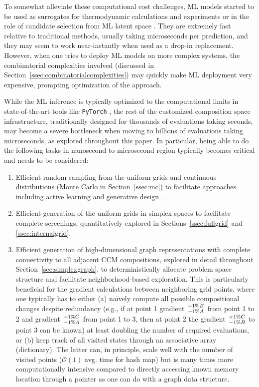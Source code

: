 To somewhat alleviate these computational cost challenges, ML models started to be used as surrogates for thermodynamic calculations and experiments \cite{Debnath2023ComparingAlloys, Tandoc2023MiningAlloys} or in the role of candidate selection from ML latent space \cite{Rao2022MachineDiscovery}. They are extremely fast relative to traditional methods, usually taking microseconds per prediction, and they may seem to work near-instantly when used as a drop-in replacement. However, when one tries to deploy ML models on more complex systems, the combinatorial complexities involved (discussed in Section~\ref{ssec:combinatorialcomplexities}) may quickly make ML deployment very expensive, prompting optimization of the approach. 

While the ML inference is typically optimized to the computational limits in state-of-the-art tools like \texttt{PyTorch} \cite{Paszke2019PyTorch:Library}, the rest of the customized composition space infrastructure, traditionally designed for thousands of evaluations taking seconds, may become a severe bottleneck when moving to billions of evaluations taking microseconds, as explored throughout this paper. In particular, being able to do the following tasks in nanosecond to microsecond region typically becomes critical and needs to be considered:

\begin{enumerate}

    \item Efficient random sampling from the uniform grids and continuous distributions (Monte Carlo in Section~\ref{ssec:mc}) to facilitate approaches including active learning \cite{Rao2022MachineDiscovery} and generative design \cite{Debnath2021GenerativeAlloys}.
    
    \item Efficient generation of the uniform grids in simplex spaces to facilitate complete screenings, quantitatively explored in Sections~\ref{ssec:fullgrid} and \ref{ssec:internalgrid}.
    
    \item Efficient generation of high-dimensional graph representations with complete connectivity to all adjacent CCM compositions, explored in detail throughout Section~\ref{sec:simplexgraph}, to deterministically allocate problem space structure and facilitate neighborhood-based exploration. This is particularly beneficial for the gradient calculations between neighboring grid points, where one typically has to either (a) na\"ively compute all possible compositional changes despite redundancy (e.g., if at point 1 gradient $+1\%B \atop -1\%A$ from point 1 to 2 and gradient $+1\%C \atop -1\%A$ from point 1 to 3, then at point 2 the gradient $+1\%C \atop -1\%B$ to point 3 can be known) at least doubling the number of required evaluations, or (b) keep track of all visited states through an associative array (dictionary). The latter can, in principle, scale well with the number of visited points ($\mathcal{O}(1)$ avg. time for hash map) but is many times more computationally intensive compared to directly accessing known memory location through a pointer as one can do with a graph data structure.
    
\end{enumerate}


